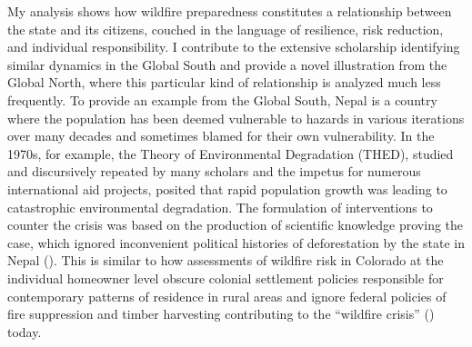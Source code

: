 \documentclass[
]{article}
\begin{document}
My analysis shows how wildfire preparedness constitutes a relationship between the state and its citizens, couched in the language of resilience, risk reduction, and individual responsibility. I contribute to the extensive scholarship identifying similar dynamics in the Global South and provide a novel illustration from the Global North, where this particular kind of relationship is analyzed much less frequently. To provide an example from the Global South, Nepal is a country where the population has been deemed vulnerable to hazards in various iterations over many decades and sometimes blamed for their own vulnerability. In the 1970s, for example, the Theory of Environmental Degradation (THED), studied and discursively repeated by many scholars and the impetus for numerous international aid projects, posited that rapid population growth was leading to catastrophic environmental degradation. The formulation of interventions to counter the crisis was based on the production of scientific knowledge proving the case, which ignored inconvenient political histories of deforestation by the state in Nepal (). This is similar to how assessments of wildfire risk in Colorado at the individual homeowner level obscure colonial settlement policies responsible for contemporary patterns of residence in rural areas and ignore federal policies of fire suppression and timber harvesting contributing to the ``wildfire crisis'' () today.
\end{document}
